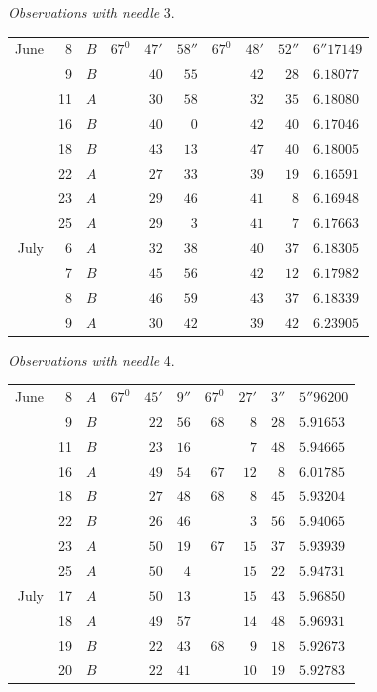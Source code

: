 \begin{center}
\textit{Observations with needle} 3.

\begin{tabular}{rr|c|rrr|rrr|l}
June&8&$B$&$67^0$&$47'$&$58''$&$67^0$&$48'$&$52''$&$6''17149$\\
&9&$B$&&$40$&$55$&&$42$&$28$&$6.18077$\\
&11&$A$&&$30$&$58$&&$32$&$35$&$6.18080$\\
&16&$B$&&$40$&$0$&&$42$&$40$&$6.17046$\\
&18&$B$&&$43$&$13$&&$47$&$40$&$6.18005$\\
&22&$A$&&$27$&$33$&&$39$&$19$&$6.16591$\\
&23&$A$&&$29$&$46$&&$41$&$8$&$6.16948$\\
&25&$A$&&$29$&$3$&&$41$&$7$&$6.17663$\\
July&6&$A$&&$32$&$38$&&$40$&$37$&$6.18305$\\
&7&$B$&&$45$&$56$&&$42$&$12$&$6.17982$\\
&8&$B$&&$46$&$59$&&$43$&$37$&$6.18339$\\
&9&$A$&&$30$&$42$&&$39$&$42$&$6.23905$
\end{tabular}
\end{center}

\begin{center}
\textit{Observations with needle} 4.

\begin{tabular}{rr|c|rrr|rrr|l}
June&8&$A$&$67^0$&$45'$&$9''$&$67^0$&$27'$&$3''$&$5''96200$\\
&9&$B$&&$22$&$56$&$68$&$8$&$28$&$5.91653$\\
&11&$B$&&$23$&$16$&&$7$&$48$&$5.94665$\\
&16&$A$&&$49$&$54$&$67$&$12$&$8$&$6.01785$\\
&18&$B$&&$27$&$48$&$68$&$8$&$45$&$5.93204$\\
&22&$B$&&$26$&$46$&&$3$&$56$&$5.94065$\\
&23&$A$&&$50$&$19$&$67$&$15$&$37$&$5.93939$\\
&25&$A$&&$50$&$4$&&$15$&$22$&$5.94731$\\
July&17&$A$&&$50$&$13$&&$15$&$43$&$5.96850$\\
&18&$A$&&$49$&$57$&&$14$&$48$&$5.96931$\\
&19&$B$&&$22$&$43$&$68$&$9$&$18$&$5.92673$\\
&20&$B$&&$22$&$41$&&$10$&$19$&$5.92783$
\end{tabular}
\end{center}

